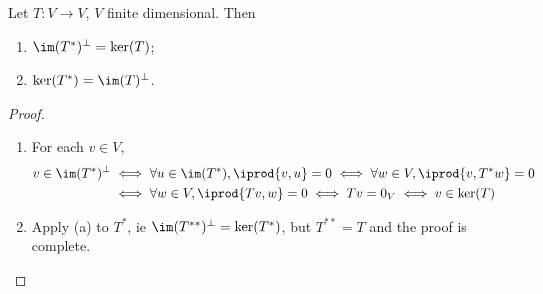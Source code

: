 \begin{proposition}
    Let $T : V \to V$, $V$ finite dimensional. Then \begin{enumerate}[label=(\alph*)]
        \item $\im(T^\ast)^\perp = \ker(T)$;
        \item $\ker(T^\ast) = \im(T)^\perp$.
    \end{enumerate}
\end{proposition}
\begin{proof}
    \begin{enumerate}[label=(\alph*)]
        \item For each $v \in V$, \begin{align*}
            v \in \im(T^\ast)^\perp &\iff \forall u \in \im(T^\ast), \iprod{v, u} = 0 \iff \forall w \in V, \iprod{v, T^\ast w} = 0\\
            &\iff \forall w \in V, \iprod{Tv, w} = 0 \iff Tv = 0_V \iff v \in \ker(T)
        \end{align*}
        \item Apply (a) to $T^\ast$, ie $\im(T^{\ast \ast})^\perp = \ker(T^\ast)$, but $T^{\ast \ast} = T$ and the proof is complete.
    \end{enumerate}
\end{proof}

